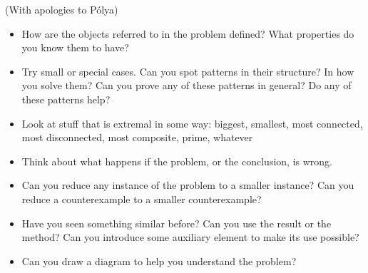 \documentclass{amsart}
\begin{document}
(With apologies to P\'olya)
\begin{itemize}
  \item How are the objects referred to in the problem defined? What properties
    do you know them to have?
  \item Try small or special cases. Can you spot patterns in their structure? In
    how you solve them? Can you prove any of these patterns in general? Do any
    of these patterns help?
  \item Look at stuff that is extremal in some way: biggest, smallest, most
    connected, most disconnected, most composite, prime, whatever
  \item Think about what happens if the problem, or the conclusion, is wrong.
  \item Can you reduce any instance of the problem to a smaller instance? 
    Can you reduce a counterexample to a smaller counterexample?
  \item Have you seen something similar before? Can you use the result or the
    method? Can you introduce some auxiliary element to make its use possible?
  \item Can you draw a diagram to help you understand the problem?
\end{itemize}
\end{document}
